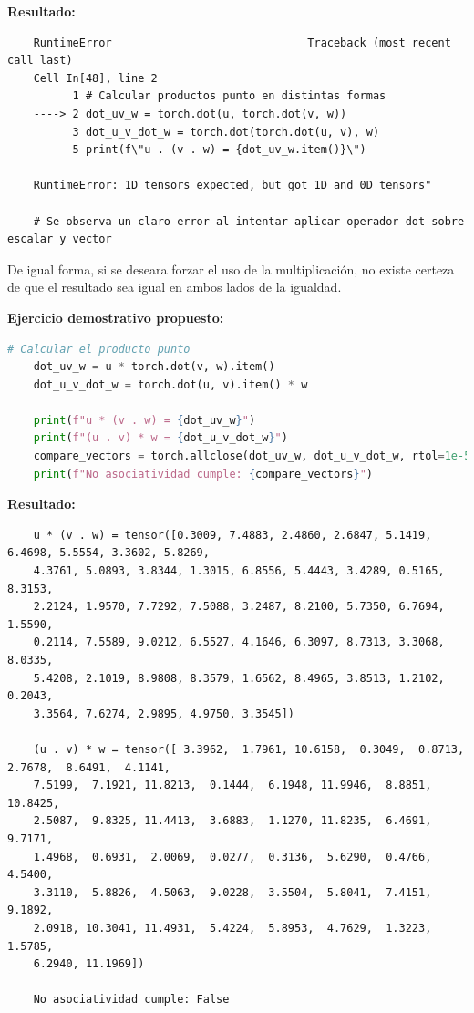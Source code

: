 \documentclass[12 pt]{article}
\begin{document}
\textbf{Resultado:}
\begin{lstlisting}
    RuntimeError                              Traceback (most recent call last)
    Cell In[48], line 2
          1 # Calcular productos punto en distintas formas
    ----> 2 dot_uv_w = torch.dot(u, torch.dot(v, w))
          3 dot_u_v_dot_w = torch.dot(torch.dot(u, v), w)
          5 print(f\"u . (v . w) = {dot_uv_w.item()}\")
    
    RuntimeError: 1D tensors expected, but got 1D and 0D tensors"

    # Se observa un claro error al intentar aplicar operador dot sobre escalar y vector
\end{lstlisting}

De igual forma, si se deseara forzar el uso de la multiplicación, no existe certeza de que el resultado sea igual en ambos lados de la igualdad.

\textbf{Ejercicio demostrativo propuesto:}
\begin{lstlisting}[language=Python]
    # Calcular el producto punto
    dot_uv_w = u * torch.dot(v, w).item()
    dot_u_v_dot_w = torch.dot(u, v).item() * w
    
    print(f"u * (v . w) = {dot_uv_w}")
    print(f"(u . v) * w = {dot_u_v_dot_w}")
    compare_vectors = torch.allclose(dot_uv_w, dot_u_v_dot_w, rtol=1e-5, atol=1e-8)
    print(f"No asociatividad cumple: {compare_vectors}")
\end{lstlisting}

\textbf{Resultado:}
\begin{lstlisting}
    u * (v . w) = tensor([0.3009, 7.4883, 2.4860, 2.6847, 5.1419, 6.4698, 5.5554, 3.3602, 5.8269,
    4.3761, 5.0893, 3.8344, 1.3015, 6.8556, 5.4443, 3.4289, 0.5165, 8.3153,
    2.2124, 1.9570, 7.7292, 7.5088, 3.2487, 8.2100, 5.7350, 6.7694, 1.5590,
    0.2114, 7.5589, 9.0212, 6.5527, 4.1646, 6.3097, 8.7313, 3.3068, 8.0335,
    5.4208, 2.1019, 8.9808, 8.3579, 1.6562, 8.4965, 3.8513, 1.2102, 0.2043,
    3.3564, 7.6274, 2.9895, 4.9750, 3.3545])

    (u . v) * w = tensor([ 3.3962,  1.7961, 10.6158,  0.3049,  0.8713,  2.7678,  8.6491,  4.1141,
    7.5199,  7.1921, 11.8213,  0.1444,  6.1948, 11.9946,  8.8851, 10.8425,
    2.5087,  9.8325, 11.4413,  3.6883,  1.1270, 11.8235,  6.4691,  9.7171,
    1.4968,  0.6931,  2.0069,  0.0277,  0.3136,  5.6290,  0.4766,  4.5400,
    3.3110,  5.8826,  4.5063,  9.0228,  3.5504,  5.8041,  7.4151,  9.1892,
    2.0918, 10.3041, 11.4931,  5.4224,  5.8953,  4.7629,  1.3223,  1.5785,
    6.2940, 11.1969])

    No asociatividad cumple: False
\end{lstlisting}
\end{document}
